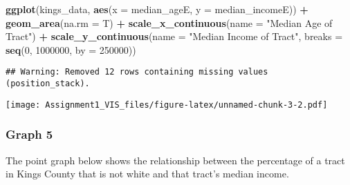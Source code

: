 \documentclass[
]{article}
\newenvironment{Shaded}{\begin{snugshade}}{\end{snugshade}}
\newcommand{\DataTypeTok}[1]{\textcolor[rgb]{0.13,0.29,0.53}{#1}}
\newcommand{\DecValTok}[1]{\textcolor[rgb]{0.00,0.00,0.81}{#1}}
\newcommand{\KeywordTok}[1]{\textcolor[rgb]{0.13,0.29,0.53}{\textbf{#1}}}
\newcommand{\NormalTok}[1]{#1}
\newcommand{\OperatorTok}[1]{\textcolor[rgb]{0.81,0.36,0.00}{\textbf{#1}}}
\newcommand{\StringTok}[1]{\textcolor[rgb]{0.31,0.60,0.02}{#1}}
\begin{document}
\begin{Shaded}
\begin{Highlighting}[]
\KeywordTok{ggplot}\NormalTok{(kings_data,}
       \KeywordTok{aes}\NormalTok{(}\DataTypeTok{x =}\NormalTok{ median_ageE,}
           \DataTypeTok{y =}\NormalTok{ median_incomeE)) }\OperatorTok{+}
\StringTok{  }\KeywordTok{geom_area}\NormalTok{(}\DataTypeTok{na.rm =}\NormalTok{ T) }\OperatorTok{+}
\StringTok{  }\KeywordTok{scale_x_continuous}\NormalTok{(}\DataTypeTok{name =} \StringTok{"Median Age of Tract"}\NormalTok{) }\OperatorTok{+}
\StringTok{  }\KeywordTok{scale_y_continuous}\NormalTok{(}\DataTypeTok{name =} \StringTok{"Median Income of Tract"}\NormalTok{,}
                     \DataTypeTok{breaks =} \KeywordTok{seq}\NormalTok{(}\DecValTok{0}\NormalTok{, }\DecValTok{1000000}\NormalTok{, }\DataTypeTok{by =} \DecValTok{250000}\NormalTok{))}
\end{Highlighting}
\end{Shaded}

\begin{verbatim}
## Warning: Removed 12 rows containing missing values (position_stack).
\end{verbatim}

\texttt{[image: Assignment1\_VIS\_files/figure-latex/unnamed-chunk-3-2.pdf]}

\hypertarget{graph-5}{%
\subsubsection{Graph 5}\label{graph-5}}

The point graph below shows the relationship between the percentage of a
tract in Kings County that is not white and that tract's median income.
\end{document}
